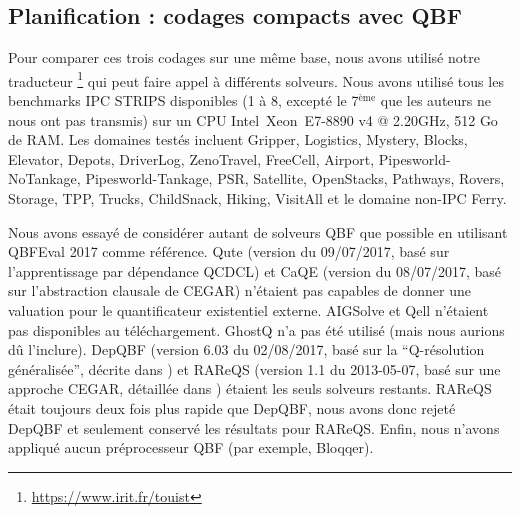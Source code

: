\subsection{Planification : codages compacts avec QBF}

Pour comparer ces trois codages sur une même base, nous avons utilisé notre traducteur \touist\footnote{\url{https://www.irit.fr/touist}} \cite{DBLP:journals/corr/SlimaneCGHLMV15} qui peut faire appel à différents solveurs.
Nous avons utilisé tous les benchmarks IPC STRIPS disponibles (1 à 8, excepté le 7$^{\text{ème}}$ que les auteurs ne nous ont pas transmis) sur un CPU Intel\textregistered\ Xeon\textregistered\ E7-8890 v4 @ 2.20GHz, 512 Go de RAM. Les domaines testés incluent Gripper, Logistics, Mystery, Blocks, Elevator, Depots, DriverLog, ZenoTravel, FreeCell, Airport, Pipesworld-NoTankage, Pipesworld-Tankage, PSR, Satellite, OpenStacks, Pathways, Rovers, Storage, TPP, Trucks, ChildSnack, Hiking, VisitAll et le domaine non-IPC Ferry.

Nous avons essayé de considérer autant de solveurs QBF que possible en utilisant QBFEval 2017 comme référence. Qute (version du 09/07/2017, basé sur l'apprentissage par dépendance QCDCL) et CaQE (version du 08/07/2017, basé sur l'abstraction clausale de CEGAR) n'étaient pas capables de donner une valuation pour le quantificateur existentiel externe. AIGSolve et Qell n'étaient pas disponibles au téléchargement. GhostQ n'a pas été utilisé (mais nous aurions dû l'inclure). DepQBF (version 6.03 du 02/08/2017, basé sur la \enquote{Q-résolution généralisée}, décrite dans \cite{DBLP:conf/cade/LonsingE17}) et RAReQS (version 1.1 du 2013-05-07, basé sur une approche CEGAR, détaillée dans \cite{DBLP:conf/sat/JanotaKMC12}) étaient les seuls solveurs restants. RAReQS était toujours deux fois plus rapide que DepQBF, nous avons donc rejeté DepQBF et seulement conservé les résultats pour RAReQS. Enfin, nous n'avons appliqué aucun préprocesseur QBF (par exemple, Bloqqer).


